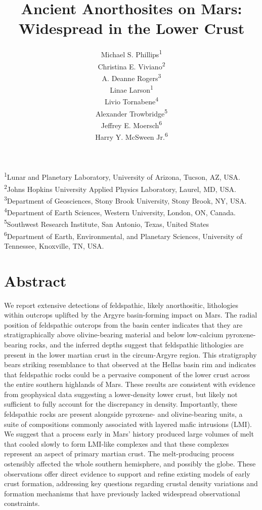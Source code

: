 \documentclass[12pt]{article}
\title{\textbf{Ancient Anorthosites on Mars: Widespread in the Lower Crust}}
\author{Michael S. Phillips\textsuperscript{1}\\ 
Christina E. Viviano\textsuperscript{2}\\
A. Deanne Rogers\textsuperscript{3}\\
Linae Larson\textsuperscript{1}\\
Livio Tornabene\textsuperscript{4}\\
Alexander Trowbridge\textsuperscript{5}\\
Jeffrey E. Moersch\textsuperscript{6}\\
Harry Y. McSween Jr.\textsuperscript{6}}
\begin{document}
\maketitle

\begin{flushleft}
\textsuperscript{1}Lunar and Planetary Laboratory, University of Arizona, Tucson, AZ, USA.\\
\textsuperscript{2}Johns Hopkins University Applied Physics Laboratory, Laurel, MD, USA.\\
\textsuperscript{3}Department of Geosciences, Stony Brook University, Stony Brook, NY, USA.\\
\textsuperscript{4}Department of Earth Sciences, Western University, London, ON, Canada.\\
\textsuperscript{5}Southwest Research Institute, San Antonio, Texas, United States\\
\textsuperscript{6}Department of Earth, Environmental, and Planetary Sciences, University of Tennessee, Knoxville, TN, USA.\\
\end{flushleft}

\newpage
\section*{Abstract}
\linenumbers
\setlength{\parindent}{0em} %
\setlength{\parskip}{6pt}   %
We report extensive detections of feldspathic, likely anorthositic, lithologies within outcrops uplifted by the Argyre basin-forming impact on Mars. The radial position of feldspathic outcrops from the basin center indicates that they are stratigraphically above olivine-bearing material and below low-calcium pyroxene-bearing rocks, and the inferred depths suggest that feldspathic lithologies are present in the lower martian crust in the circum-Argyre region. This stratigraphy bears striking resemblance to that observed at the Hellas basin rim and indicates that feldspathic rocks could be a pervasive component of the lower crust across the entire southern highlands of Mars. These results are consistent with evidence from geophysical data suggesting a lower-density lower crust, but likely not sufficient to fully account for the discrepancy in density. Importantly, these feldspathic rocks are present alongside pyroxene- and olivine-bearing units, a suite of compositions commonly associated with layered mafic intrusions (LMI). We suggest that a process early in Mars' history produced large volumes of melt that cooled slowly to form LMI-like complexes and that these complexes represent an aspect of primary martian crust. The melt-producing process ostensibly affected the whole southern hemisphere, and possibly the globe. These observations offer direct evidence to support and refine existing models of early crust formation, addressing key questions regarding crustal density variations and formation mechanisms that have previously lacked widespread observational constraints.
\end{document}
